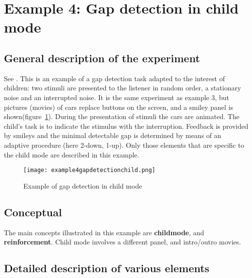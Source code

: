 \newpage
\section{Example 4: Gap detection in child mode}

\subsection{General description of the experiment}
See . This is an
example of a gap detection task adapted to the interest of
children: two stimuli are presented to the listener in random
order, a stationary noise and an interrupted noise. It is the same
experiment as example 3, but pictures (movies) of cars replace
buttons on the screen, and a smiley panel is
shown(figure~\ref{fig:gapchild}). During the presentation of
stimuli the cars are animated. The child's task is to indicate the
stimulus with the interruption. Feedback is provided by smileys
and the minimal detectable gap is determined by means of an
adaptive procedure (here 2-down, 1-up). Only those elements that
are specific to the child mode are described in this example.


\begin{figure}
 \centering
\texttt{[image: example4gapdetectionchild.png]}
 \caption{Example of gap detection in child mode}
 \label{fig:gapchild}
\end{figure}

\subsection{Conceptual}
The main concepts illustrated in this example are
\textbf{childmode}, and \textbf{reinforcement}. Child mode
involves a different panel, and intro/outro movies.

\subsection{Detailed description of various elements}

